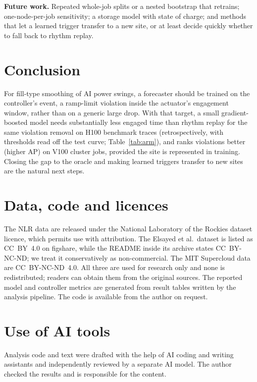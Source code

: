 \documentclass[11pt]{article}
\begin{document}
\textbf{Future work.} Repeated whole-job splits or a nested bootstrap that retrains; one-node-per-job
sensitivity; a storage model with state of charge; and methods that let a learned trigger transfer to a
new site, or at least decide quickly whether to fall back to rhythm replay.

\section{Conclusion}

For fill-type smoothing of AI power swings, a forecaster should be trained on the controller's event, a
ramp-limit violation inside the actuator's engagement window, rather than on a generic large drop. With
that target, a small gradient-boosted model needs substantially less engaged time than rhythm replay for
the same violation removal on H100 benchmark traces (retrospectively, with thresholds read off the test
curve; Table~\ref{tab:arm}), and ranks violations better (higher AP) on V100
cluster jobs, provided the site is represented in training. Closing the gap to the oracle and making learned
triggers transfer to new sites are the natural next steps.

\section*{Data, code and licences}
The NLR data are released under the National Laboratory of the Rockies dataset licence, which permits
use with attribution. The Elsayed et al.\ dataset is listed as CC~BY~4.0 on figshare, while the README
inside its archive states CC~BY-NC-ND; we treat it conservatively as non-commercial. The MIT Supercloud
data are CC~BY-NC-ND~4.0. All three are used for research only and none is redistributed; readers can
obtain them from the original sources. The reported model and controller metrics are generated from result tables written by the analysis
pipeline. The code is available from the author on request.

\section*{Use of AI tools}
Analysis code and text were drafted with the help of AI coding and writing assistants and independently
reviewed by a separate AI model. The author checked the results and is responsible for the content.
\end{document}
